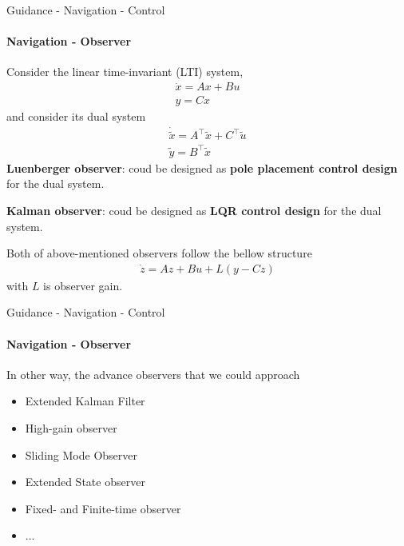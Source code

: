 
\begin{frame}{Guidance - Navigation - Control}
	\framesubtitle{Navigation - Observer}
	Consider the linear time-invariant (LTI) system, 
	\begin{align}
		\dot{x} = Ax + Bu\\
		y = Cx
	\end{align}
	and consider its dual system
	\begin{align}
		\dot{\tilde{x}} = A^\top\tilde{x} + C^\top\tilde{u}\\
		\tilde{y} = B^\top\tilde{x}
	\end{align}
	\textbf{Luenberger observer}: coud be designed as \textbf{pole placement control design} for the dual system.

	\textbf{Kalman observer}: coud be designed as \textbf{LQR control design} for the dual system.
	
	Both of above-mentioned observers follow the bellow structure
	\begin{align}
		\dot{z} = Az + Bu + L(y - Cz)
	\end{align}
	with $L$ is observer gain.
	
\end{frame}



\begin{frame}{Guidance - Navigation - Control}
	\framesubtitle{Navigation - Observer}
	In other way, the advance observers that we could approach
	\begin{itemize}
		\item Extended Kalman Filter
		\item High-gain observer
		\item Sliding Mode Observer
		\item Extended State observer
		\item Fixed- and Finite-time observer
		\item ...
	\end{itemize}
	
\end{frame}


